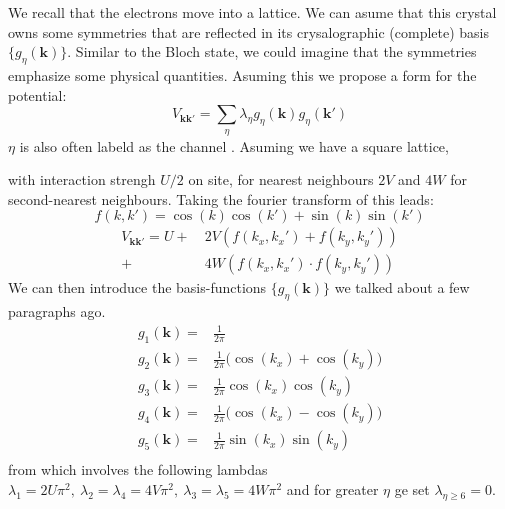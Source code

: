\documentclass[../main.tex]{subfile}
\begin{document}
We recall that the electrons move into a lattice. We can asume that this crystal owns some symmetries that are reflected in its crysalographic (complete) basis $\{g_{\eta}(\bm{k})\}$.
Similar to the Bloch state, we could imagine that the symmetries emphasize some physical quantities. Asuming this we propose a form for the potential:
\[
    V_{\bm{k}\bm{k}'} = \sum_{\eta} \lambda_{\eta} g_{\eta}(\bm{k})g_{\eta}(\bm{k}')
\]
$\eta$ is also often labeld as the channel \cite{FossheimSudbo2004}. Asuming we have a square lattice, 
\begin{figure}[H]
    \centering
\end{figure}
with interaction strengh $U/2$ on site, for nearest neighbours $2V$ and $4W$ for second-nearest neighbours. 
Taking the fourier transform of this leads:
\[
    f(k,k')=\cos(k)\cos(k')+\sin(k)\sin(k')
\]
\[
\begin{aligned}
    V_{\bm{k}\bm{k}'} = U + &~2V\left(f(k_x,k_x')+ f(k_y,k_y')\right)\\
    + &~4W \left(f(k_x,k_x') \cdot f(k_y,k_y')\right)
\end{aligned} 
\]
We can then introduce the basis-functions $\{g_{\eta}(\bm{k})\}$ we talked about a few paragraphs ago.
\begin{align*}
    g_{1}(\bm{k}) =& \frac{1}{2\pi}\\
    g_{2}(\bm{k}) =& \frac{1}{2\pi}\bigl( \cos(k_x) + \cos(k_y)\bigr) \tag{s-wave}\\
    g_{3}(\bm{k}) =& \frac{1}{2\pi}\cos(k_x) \cos(k_y)\\
    g_{4}(\bm{k}) =& \frac{1}{2\pi}\bigl( \cos(k_x) - \cos(k_y)\bigr) \tag{d-wave}\\
    g_{5}(\bm{k}) =& \frac{1}{2\pi}\sin(k_x) \sin(k_y)\\
\end{align*}
from which involves the following lambdas $\lambda_1 = 2U\pi^2, ~ \lambda_2=\lambda_4 = 4V\pi^2, ~ \lambda_3=\lambda_5=4W \pi^2$ and for greater
$\eta$ ge set $\lambda_{\eta\ge6} =0$.\\
\end{document}
